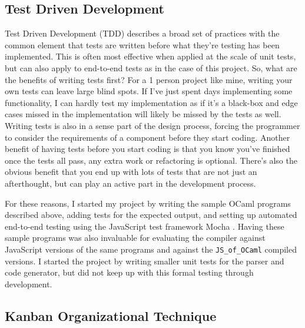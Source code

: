 \documentclass[12pt,a4paper,twoside,openright]{report}
\newcommand{\JSofOCaml}{{\tt JS\_of\_OCaml} }
\begin{document}
\subsection{Test Driven Development}
Test Driven Development (TDD) describes a broad set of practices with the common element that tests are written before what they're testing has been implemented.
This is often most effective when applied at the scale of unit tests, but can also apply to end-to-end tests as in the case of this project.
So, what are the benefits of writing tests first?
For a 1 person project like mine, writing your own tests can leave large blind spots.
If I've just spent days implementing some functionality, I can hardly test my implementation as if it's a black-box and edge cases missed in the implementation will likely be missed by the tests as well.
Writing tests is also in a sense part of the design process, forcing the programmer to consider the requirements of a component before they start coding.
Another benefit of having tests before you start coding is that you know you've finished once the tests all pass, any extra work or refactoring is optional.
There's also the obvious benefit that you end up with lots of tests that are not just an afterthought, but can play an active part in the development process.

For these reasons, I started my project by writing the sample OCaml programs described above, adding tests for the expected output, and setting up automated end-to-end testing using the JavaScript test framework Mocha \cite{mochaorg}.
Having these sample programs was also invaluable for evaluating the compiler against JavaScript versions of the same programs and against the \JSofOCaml \cite{jsofocaml} compiled versions.
I started the project by writing smaller unit tests for the parser and code generator, but did not keep up with this formal testing through development.

\subsection{Kanban Organizational Technique}
\end{document}
